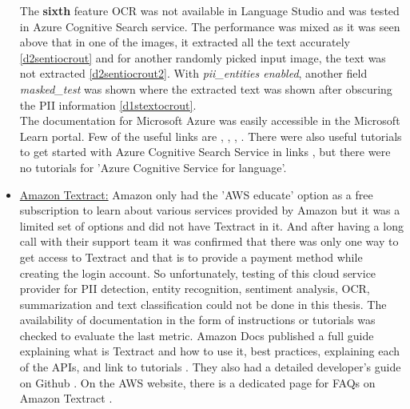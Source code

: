 \begin{itemize}
    The \textbf{sixth} feature \acs{OCR} was not available in Language Studio and was tested in Azure Cognitive Search service. The performance was mixed as it was seen above that in one of the images, it extracted all the text accurately \ref{d2sentiocrout} and for another randomly picked input image, the text was not extracted \ref{d2sentiocrout2}. With \textit{pii\_entities enabled}, another field \textit{masked\_test} was shown where the extracted text was shown after obscuring the \acs{PII} information \ref{d1stextocrout}.\\
    The documentation for Microsoft Azure was easily accessible in the Microsoft Learn portal. Few of the useful links are \cite{azdocs1}, \cite{azdocs2}, \cite{azdocs3}, \cite{azdocs4}. There were also useful tutorials to get started with Azure Cognitive Search Service in links \cite{azdocs}, \cite{azuretutorial} but there were no tutorials for 'Azure Cognitive Service for language'.
    
    \item \underline{Amazon Textract:} Amazon only had the '\acs{AWS} educate' option as a free subscription to learn about various services provided by Amazon but it was a limited set of options and did not have Textract in it. And after having a long call with their support team it was confirmed that there was only one way to get access to Textract and that is to provide a payment method while creating the login account. So unfortunately, testing of this cloud service provider for \acs{PII} detection, entity recognition, sentiment analysis, \acs{OCR}, summarization and text classification could not be done in this thesis. The availability of documentation in the form of instructions or tutorials was checked to evaluate the last metric. Amazon Docs published a full guide \cite{awspdf} explaining what is Textract and how to use it, best practices, explaining each of the \acs{API}s, and link to tutorials \cite{awstut}. They also had a detailed developer's guide on Github \cite{awsgit}. On the AWS website, there is a dedicated page for \acs{FAQ}s on Amazon Textract \cite{awsfaq} \cite{awstextarct}. 
    

\end{itemize}
